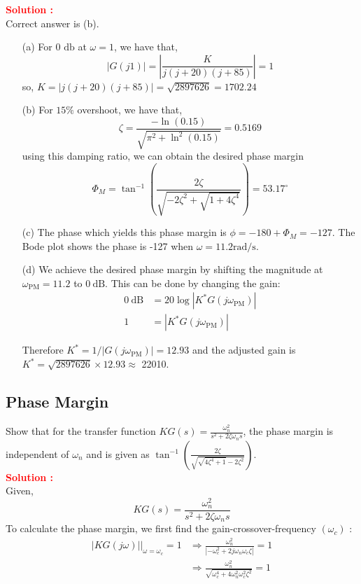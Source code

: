 \documentclass[12pt]{article}
\begin{document}
\textbf{\textcolor{red}{Solution :}} \\
Correct answer is (b).\\
\begin{enumerate}
    \item  [(a)] For 0 $\mathrm{db}$ at $\omega=1$, we have that,
$$ |G(j 1)|=\left|\frac{K}{j(j+20)(j+85)}\right|=1 $$
so,  $K=|j(j+20)(j+85)|=\sqrt{2897626}=1702.24$
\item  [(b)] For $15 \%$ overshoot, we have that,
$$ \zeta=\frac{-\ln (0.15)}{\sqrt{\pi^2+\ln ^2(0.15)}}=0.5169 $$
using this damping ratio, we can obtain the desired phase margin
$$ \Phi_M=\tan ^{-1}\left(\frac{2 \zeta}{\sqrt{-2 \zeta^2+\sqrt{1+4 \zeta^4}}}\right)=53.17^{\circ} $$

\item  [(c)] The phase which yields this phase margin is $\phi=-180+\Phi_M=-127$. The Bode plot shows the phase is -127 when $\omega=11.2 \mathrm{rad} / \mathrm{s}$. 
\item  [(d)] We achieve the desired phase margin by shifting the magnitude at $\omega_{\mathrm{PM}}=11.2$ to $0 \mathrm{~dB}$. This can be done by changing the gain:
$$
\begin{aligned}
0 \mathrm{~dB} & =20 \log \left|K^* G\left(j \omega_{\mathrm{PM}}\right)\right| \\
1 & =\left|K^* G\left(j \omega_{\mathrm{PM}}\right)\right|
\end{aligned}
$$

Therefore $K^*=1 /\left|G\left(j \omega_{\mathrm{PM}}\right)\right|=12.93$ and the adjusted gain is $K^*=\sqrt{2897626} \times 12.93 \approx$ 22010.
\end{enumerate}
\clearpage

\subsection{Phase Margin}

Show that for the transfer function $K G(s)=\frac{\omega_n^2}{s^2+2 \zeta \omega_n s}$, the phase margin is independent of $\omega_n$ and is given as $\tan ^{-1}\left(\frac{2 \zeta}{\sqrt{\sqrt{4 \zeta^4+1}-2 \zeta^2}}\right)$. \\
\textbf{\textcolor{red}{Solution :}}\\

Given,
$$ K G(s)=\frac{\omega_n^2}{s^2+2 \zeta \omega_n s} $$
To calculate the phase margin, we first find the gain-crossover-frequency $\left(\omega_c\right)$ :
\begin{align*}
\left.|K G(j \omega)|\right|_{\omega=\omega_c}=1 & \Rightarrow \frac{\omega_n^2}{\left|-\omega_c^2+2 j \omega_n \omega_c \zeta\right|}=1 \\
& \Rightarrow \frac{\omega_n^2}{\sqrt{\omega_c^4+4 \omega_n^2 \omega_c^2 \zeta^2}}=1
\end{align*}
\end{document}
